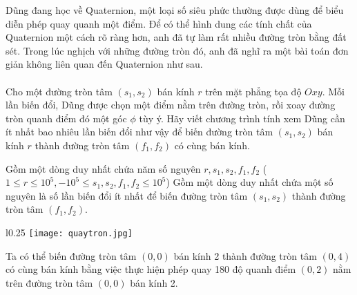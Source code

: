 \documentclass[11pt,a4paper,oneside]{article}
\begin{document}

Dũng đang học về Quaternion, một loại số siêu phức thường được dùng để biểu diễn phép quay quanh một điểm. Để có thể hình dung các tính chất của Quaternion một cách rõ ràng hơn, anh đã tự làm rất nhiều đường tròn bằng đất sét. Trong lúc nghịch với những đường tròn đó, anh đã nghĩ ra một bài toán đơn giản không liên quan đến Quaternion như sau. \\\\
Cho một đường tròn tâm $(s_1,s_2)$ bán kính $r$ trên mặt phẳng tọa độ $Oxy$. Mỗi lần biến đổi, Dũng được chọn một điểm nằm trên đường tròn, rồi xoay đường tròn quanh điểm đó một góc $\phi$ tùy ý. Hãy viết chương trình tính xem Dũng cần ít nhất bao nhiêu lần biến đổi như vậy để biến đường tròn tâm $(s_1,s_2)$ bán kính $r$ thành đường tròn tâm $(f_1,f_2)$ có cùng bán kính.

Gồm một dòng duy nhất chứa năm số nguyên $r, s_1, s_2, f_1, f_2$ ($1 \leq r \leq 10^5, -10^5 \leq s_1, s_2, f_1, f_2 \leq 10^5$)
Gồm một dòng duy nhất chứa một số nguyên là số lần biến đổi ít nhất để biến đường tròn tâm $(s_1, s_2)$ thành đường tròn tâm $(f_1,f_2)$.
\begin{example}
%
\end{example}
\begin{wrapfigure}{l}{0.25\textwidth}
    \centering
    \texttt{[image: quaytron.jpg]}
\end{wrapfigure}
 
Ta có thể biến đường tròn tâm $(0,0)$ bán kính 2 thành đường tròn tâm $(0,4)$ có cùng bán kính bằng việc thực hiện phép quay 180 độ quanh điểm $(0,2)$ nằm trên đường tròn tâm $(0,0)$ bán kính 2. 
\end{document}
